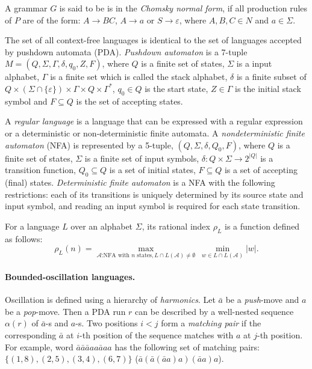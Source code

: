 \documentclass[11pt,a4paper]{article} %
\begin{document}
A grammar $G$ is said to be is in the \textit{Chomsky normal form}, if all production rules of $P$ are of the form:
$A \rightarrow BC$, $A \rightarrow a$ or $S \rightarrow \varepsilon$, where $A, B, C \in N$ and $a \in \Sigma$. 


The set of all context-free languages is identical to the set of languages accepted by pushdown automata (PDA). \textit{Pushdown automaton} is a 7-tuple $M = (Q, \Sigma, \Gamma, \delta, q_0, Z, F)$, where $Q$ is a finite set of states, $\Sigma$ is a input alphabet, $\Gamma$ is a finite set which is called the stack alphabet, $\delta$ is a finite subset of $Q \times (\Sigma \cap \{\varepsilon\}) \times \Gamma \times Q \times \Gamma^*$,
$q_{0}\in Q$ is the start state, $Z \in \Gamma$ is the initial stack symbol and
$F\subseteq Q$ is the set of accepting states.


A \textit{regular language} is a language that can be expressed with a regular expression or a deterministic or non-deterministic finite automata.
A \textit{nondeterministic finite automaton} (NFA) is represented by a 5-tuple, $(Q,\Sigma ,\delta ,Q_{0},F)$, where $Q$ is a finite set of states, $\Sigma$ is a finite set of input symbols, $\delta:Q\times \Sigma \rightarrow 2^{|Q|}$ is a transition function, $Q_0 \subseteq Q$ is a set of initial states, $F \subseteq Q$ is a set of accepting (final) states. \textit{Deterministic finite automaton} is a NFA with the following restrictions: each of its transitions is uniquely determined by its source state and input symbol, and reading an input symbol is required for each state transition.


 For a language $L$ over an alphabet $\Sigma$, its rational index $\rho_L$ is a function defined as follows:
$$\rho_L(n) = \max_{\mathcal{A} \text{:NFA with }n\text{ states}, L \cap L(\mathcal{A}) \neq \emptyset}\ \min_{w \in  L \cap L(\mathcal{A})}|w|.$$ 


\paragraph{Bounded-oscillation languages.} 
Oscillation is defined using a hierarchy of \textit{harmonics}. Let $\bar{a}$ be a \textit{push}-move and $a$ be a \textit{pop}-move. Then a PDA run $r$ can be described by a well-nested sequence $\alpha(r)$ of $\bar{a}$-s and $a$-s. Two positions $i<j$ form a \textit{matching pair} if the corresponding $\bar{a}$ at $i$-th position of the sequence matches with $a$ at $j$-th position. For example, word $\bar{a}\bar{a}\bar{a}aa\bar{a}aa$ has the following set of matching pairs: $\{(1, 8), (2, 5), (3, 4), (6, 7)\}$ ($\bar{a}(\bar{a}(\bar{a}a)a)(\bar{a}a)a$).
\end{document}
